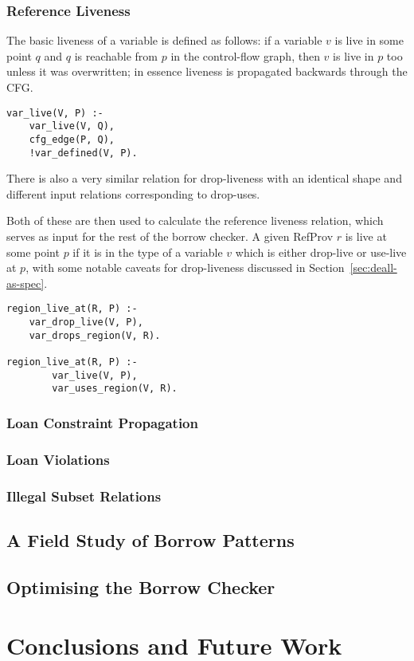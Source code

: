 \documentclass{UUThesisTemplate}
\newcommand{\fixme}[1] {{\color{red}#1}}
\begin{document}
\subsection{Reference Liveness}
\label{sec:var-livenes}

The basic liveness of a variable is defined as follows: if a variable $v$ is
live in some point $q$ and $q$ is reachable from $p$ in the control-flow graph,
then $v$ is live in $p$ too unless it was overwritten; in essence liveness is
propagated backwards through the CFG.

\begin{verbatim}
var_live(V, P) :-
    var_live(V, Q),
    cfg_edge(P, Q),
    !var_defined(V, P).
\end{verbatim}

There is also a very similar relation for drop-liveness with an identical shape
and different input relations corresponding to drop-uses.


Both of these are then used to calculate the reference liveness relation, which
serves as input for the rest of the borrow checker. A given RefProv $r$ is live
at some point $p$ if it is in the type of a variable $v$ which is either
drop-live or use-live at $p$, with some notable caveats for drop-liveness
discussed in Section~\ref{sec:deall-as-spec}.

\begin{verbatim}
region_live_at(R, P) :-
    var_drop_live(V, P),
    var_drops_region(V, R).
        
region_live_at(R, P) :-
        var_live(V, P),
        var_uses_region(V, R).
\end{verbatim}



\subsection{Loan Constraint Propagation}

\subsection{Loan Violations}

\subsection{Illegal Subset Relations}

\section{A Field Study of Borrow Patterns}

\section{Optimising the Borrow Checker}


\chapter{Conclusions and Future Work}


\printbibliography[heading=bibintoc]
\end{document}
